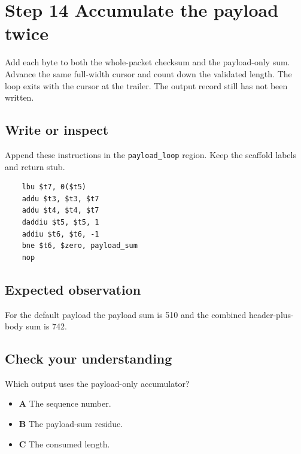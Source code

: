 \section{Step 14 Accumulate the payload twice}\label{packet-s14}

Add each byte to both the whole-packet checksum and the payload-only sum. Advance the same full-width cursor and count down the validated length. The loop exits with the cursor at the trailer. The output record still has not been written.

\subsection{Write or inspect}
Append these instructions in the \texttt{payload\_loop} region. Keep the scaffold labels and return stub.

\begin{verbatim}
    lbu $t7, 0($t5)
    addu $t3, $t3, $t7
    addu $t4, $t4, $t7
    daddiu $t5, $t5, 1
    addiu $t6, $t6, -1
    bne $t6, $zero, payload_sum
    nop
\end{verbatim}

\subsection{Expected observation}
For the default payload the payload sum is 510 and the combined header-plus-body sum is 742.

\subsection{Check your understanding}
Which output uses the payload-only accumulator?

\begin{itemize}
  \item \textbf{A} The sequence number.
  \item \textbf{B} The payload-sum residue.
  \item \textbf{C} The consumed length.
\end{itemize}
